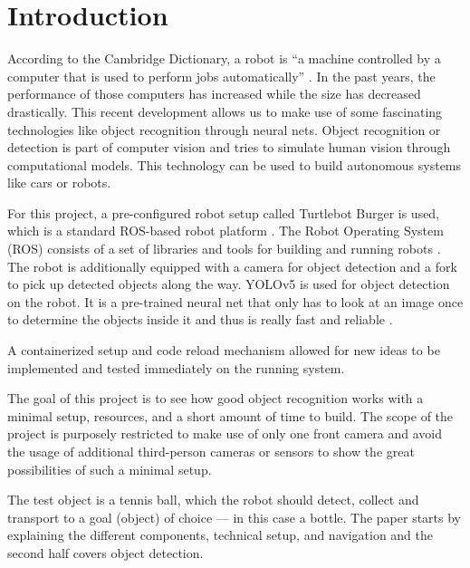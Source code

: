 \section{Introduction}

According to the Cambridge Dictionary, a robot is \enquote{a machine controlled by a computer that is used to perform jobs automatically} \autocite{dict-cambridge}. In the past years, the performance of those computers has increased while the size has decreased drastically. This recent development allows us to make use of some fascinating technologies like object recognition through neural nets. Object recognition or detection is part of computer vision and tries to simulate human vision through computational models. This technology can be used to build autonomous systems like cars or robots.

For this project, a pre-configured robot setup called Turtlebot Burger is used, which is a standard ROS-based robot platform \autocite{emanual-turtlebot3-ov}. The Robot Operating System (ROS) consists of a set of libraries and tools for building and running robots \autocite{ros-technical-overview}. The robot is additionally equipped with a camera for object detection and a fork to pick up detected objects along the way. YOLOv5 is used for object detection on the robot. It is a pre-trained neural net that only has to look at an image once to determine the objects inside it and thus is really fast and reliable \autocite{ultralytics}.

A containerized setup and code reload mechanism allowed for new ideas to be implemented and tested immediately on the running system.

The goal of this project is to see how good object recognition works with a minimal setup, resources, and a short amount of time to build. The scope of the project is purposely restricted to make use of only one front camera and avoid the usage of additional third-person cameras or sensors to show the great possibilities of such a minimal setup.

The test object is a tennis ball, which the robot should detect, collect and transport to a goal (object) of choice --- in this case a bottle. The paper starts by explaining the different components, technical setup, and navigation and the second half covers object detection.